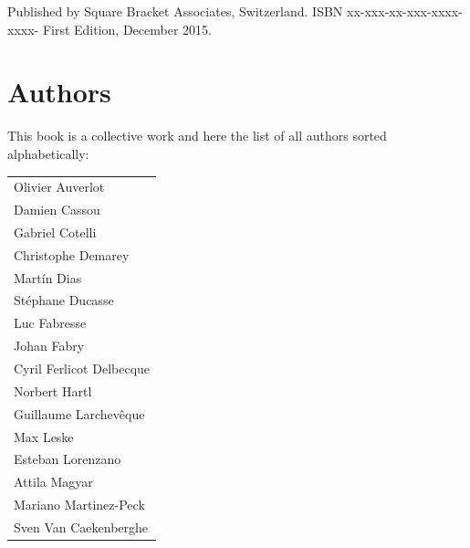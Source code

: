 \documentclass[10pt,twoside,english,showtrims]{support/latex/sbabook}
\begin{document}
\begin{listing}
Published by Square Bracket Associates, Switzerland.
ISBN xx-xxx-xx-xxx-xxxx-xxxx-
First Edition, December 2015.
\end{listing}

\chapter*{Authors}

This book is a collective work and here the list of all authors sorted alphabetically:

\begin{tabular}{l}
Olivier Auverlot\\
Damien Cassou\\
Gabriel Cotelli\\
Christophe Demarey\\
Martín Dias\\
Stéphane Ducasse\\
Luc Fabresse\\
Johan Fabry\\
Cyril Ferlicot Delbecque\\
Norbert Hartl\\
Guillaume Larchevêque\\
Max Leske\\
Esteban Lorenzano\\
Attila Magyar\\
Mariano Martinez-Peck\\
Sven Van Caekenberghe\\
\end{tabular}

\tableofcontents

\mainmatter

% 
% 

% 
% 
% 
% 
% 

% 
% 
% 
% 
% 

% 
% 
% 
% 

% 

\backmatter
\end{document}
